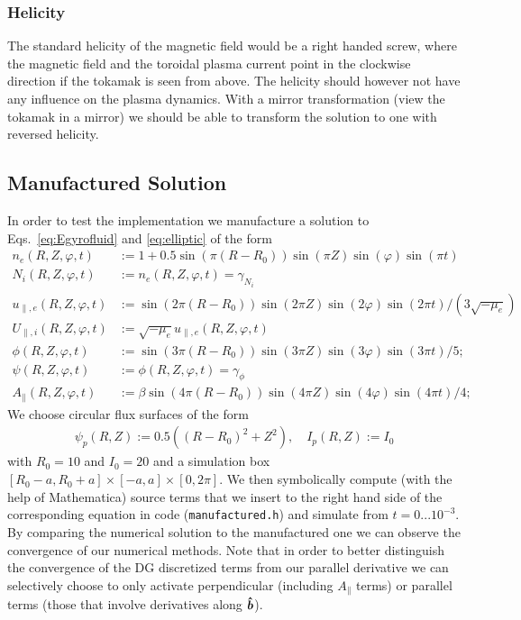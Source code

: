 \subsubsection{Helicity}
The standard helicity of the magnetic field would be a right handed screw,
where the magnetic field and the toroidal plasma current point in the clockwise
direction if the tokamak is seen from above.
The helicity should however not have any influence on the plasma dynamics. With
a mirror transformation (view the tokamak in a mirror) we should be able
to transform the solution to one with reversed helicity.

\subsection{Manufactured Solution}
In order to test the implementation we manufacture a solution to Eqs.~\eqref{eq:Egyrofluid} and \eqref{eq:elliptic} of the form
\begin{align*}
n_e(R,Z,\varphi, t) &:= 1 + 0.5\sin(\pi(R-R_0))\sin(\pi Z)\sin(\varphi)\sin(\pi t) \\
N_i(R,Z,\varphi, t) &:= n_e(R,Z,\varphi,t) = \gamma_{ N_i}  \\
u_{\parallel,e}(R,Z,\varphi, t) &:= \sin(2\pi(R-R_0))\sin(2\pi Z)\sin(2\varphi)\sin(2\pi t)/(3\sqrt{-\mu_e}) \\
U_{\parallel,i}(R,Z,\varphi, t) &:= \sqrt{-\mu_e}u_{\parallel,e}(R,Z,\varphi,t) \\
\phi(R,Z,\varphi,t) &:= \sin(3\pi(R-R_0))\sin(3\pi Z)\sin(3\varphi)\sin(3\pi t)/5; \\
\psi(R,Z,\varphi,t) &:= \phi(R,Z,\varphi, t) = \gamma_{\phi} \\
A_\parallel( R,Z,\varphi,t) &:= \beta\sin(4\pi(R-R_0))\sin(4\pi Z)\sin(4\varphi)\sin(4\pi t)/4;
\end{align*}
We choose circular flux surfaces of the form
\begin{align*}
\psi_p(R,Z) :=0.5((R-R_0)^2 + Z^2),\quad
I_p(R,Z):=I_0
\end{align*}
with $R_0=10$ and $I_0=20$ and a simulation box $[R_0-a,R_0+a]\times[-a,a]\times[0,2\pi]$.
We then symbolically compute (with the help of Mathematica) source terms that we insert to the right hand side of
the corresponding equation in code (\texttt{manufactured.h}) and simulate from $t=0...10^{-3}$.
By comparing the numerical solution to the manufactured one we can observe the convergence of our numerical methods. Note that in order to better distinguish
the convergence of the DG discretized terms from our parallel derivative
we can selectively choose to only activate perpendicular (including $A_\parallel$ terms) or parallel terms (those that involve derivatives along $\bm{\hat{b}}$).

